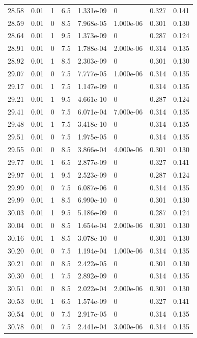\documentclass[preview]{standalone}
\begin{document}
{{{{{{{{\begin{tabular}{L{1.2cm}C{1.2cm} C{0.3cm}C{0.5cm} C{1.4cm}C{1.4cm} C{1.4cm}C{1.4cm}}
  28.58  &  0.01  & 1     & 6.5 &  1.331e-09  & 0  & 0.327 &  0.141   \\ 
  28.59  &  0.01  & 0     & 8.5 &  7.968e-05  & 1.000e-06  & 0.301 &  0.130   \\ 
  28.64  &  0.01  & 1     & 9.5 &  1.373e-09  & 0  & 0.287 &  0.124   \\ 
  28.91  &  0.01  & 0     & 7.5 &  1.788e-04  & 2.000e-06  & 0.314 &  0.135   \\ 
  28.92  &  0.01  & 1     & 8.5 &  2.303e-09  & 0  & 0.301 &  0.130   \\ 
  29.07  &  0.01  & 0     & 7.5 &  7.777e-05  & 1.000e-06  & 0.314 &  0.135   \\ 
  29.17  &  0.01  & 1     & 7.5 &  1.147e-09  & 0  & 0.314 &  0.135   \\ 
  29.21  &  0.01  & 1     & 9.5 &  4.661e-10  & 0  & 0.287 &  0.124   \\ 
  29.41  &  0.01  & 0     & 7.5 &  6.071e-04  & 7.000e-06  & 0.314 &  0.135   \\ 
  29.48  &  0.01  & 1     & 7.5 &  3.418e-10  & 0  & 0.314 &  0.135   \\ 
  29.51  &  0.01  & 0     & 7.5 &  1.975e-05  & 0  & 0.314 &  0.135   \\ 
  29.55  &  0.01  & 0     & 8.5 &  3.866e-04  & 4.000e-06  & 0.301 &  0.130   \\ 
  29.77  &  0.01  & 1     & 6.5 &  2.877e-09  & 0  & 0.327 &  0.141   \\ 
  29.97  &  0.01  & 1     & 9.5 &  2.523e-09  & 0  & 0.287 &  0.124   \\ 
  29.99  &  0.01  & 0     & 7.5 &  6.087e-06  & 0  & 0.314 &  0.135   \\ 
  29.99  &  0.01  & 1     & 8.5 &  6.990e-10  & 0  & 0.301 &  0.130   \\ 
  30.03  &  0.01  & 1     & 9.5 &  5.186e-09  & 0  & 0.287 &  0.124   \\ 
  30.04  &  0.01  & 0     & 8.5 &  1.654e-04  & 2.000e-06  & 0.301 &  0.130   \\ 
  30.16  &  0.01  & 1     & 8.5 &  3.078e-10  & 0  & 0.301 &  0.130   \\ 
  30.20  &  0.01  & 0     & 7.5 &  1.194e-04  & 1.000e-06  & 0.314 &  0.135   \\ 
  30.21  &  0.01  & 0     & 8.5 &  2.422e-05  & 0  & 0.301 &  0.130   \\ 
  30.30  &  0.01  & 1     & 7.5 &  2.892e-09  & 0  & 0.314 &  0.135   \\ 
  30.51  &  0.01  & 0     & 8.5 &  2.022e-04  & 2.000e-06  & 0.301 &  0.130   \\ 
  30.53  &  0.01  & 1     & 6.5 &  1.574e-09  & 0  & 0.327 &  0.141   \\ 
  30.54  &  0.01  & 0     & 7.5 &  2.917e-05  & 0  & 0.314 &  0.135   \\ 
  30.78  &  0.01  & 0     & 7.5 &  2.441e-04  & 3.000e-06  & 0.314 &  0.135   \\ 
\hline 
\end{tabular} 

}}}}}}}}
\end{document}
